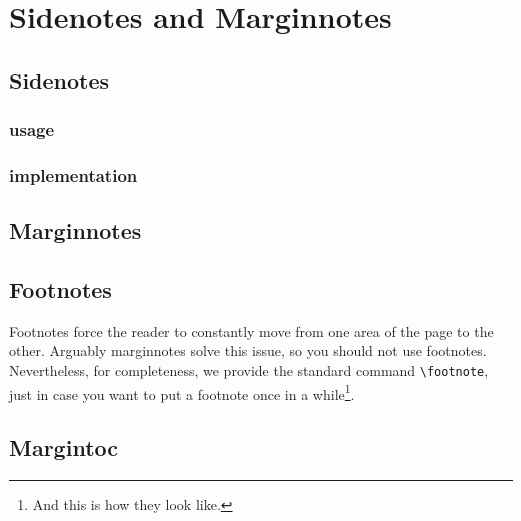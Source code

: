 \setchapterpreamble[u]{\margintoc}
\chapter{Sidenotes and Marginnotes}

\section{Sidenotes}

\subsection{usage}

\subsection{implementation}

\section{Marginnotes}

\section{Footnotes}

Footnotes force the reader to constantly move from one area of the page 
to the other. Arguably marginnotes solve this issue, so you should not 
use footnotes. Nevertheless, for completeness, we provide the standard 
command \verb|\footnote|, just in case you want to put a footnote once 
in a while\footnote{And this is how they look like.}.

\section{Margintoc}
